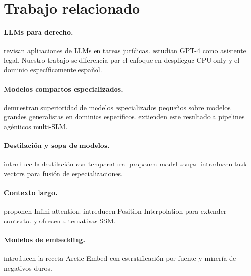 \documentclass[11pt,a4paper]{article}
\begin{document}
\section{Trabajo relacionado}
\label{sec:related}

\paragraph{LLMs para derecho.} \citet{nay2023large} revisan aplicaciones de LLMs
en tareas jurídicas. \citet{zheng2023does} estudian GPT-4 como asistente legal.
Nuestro trabajo se diferencia por el enfoque en despliegue CPU-only y el dominio
específicamente español.

\paragraph{Modelos compactos especializados.} \citet{gurgurov2024adapting} demuestran
superioridad de modelos especializados pequeños sobre modelos grandes generalistas
en dominios específicos. \citet{belcak2025small} extienden este resultado a pipelines
agénticos multi-SLM.

\paragraph{Destilación y sopa de modelos.} \citet{hinton2015distilling} introduce
la destilación con temperatura. \citet{wortsman2022model} proponen model soups.
\citet{ilharco2023editing} introducen task vectors para fusión de especializaciones.

\paragraph{Contexto largo.} \citet{munkhdalai2024leave} proponen Infini-attention.
\citet{chen2023extending} introducen Position Interpolation para extender contexto.
\citet{bertsch2024unlimiformer} y \citet{gu2023mamba} ofrecen alternativas SSM.

\paragraph{Modelos de embedding.} \citet{merrick2024arctic} introducen la receta
Arctic-Embed con estratificación por fuente y minería de negativos duros.
\end{document}
